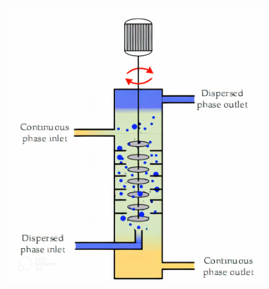 \begin{figure}[h!]
    \includegraphics[height=0.3\textheight]{image/scheme_liq-liq_mieux.png}

\end{figure}
